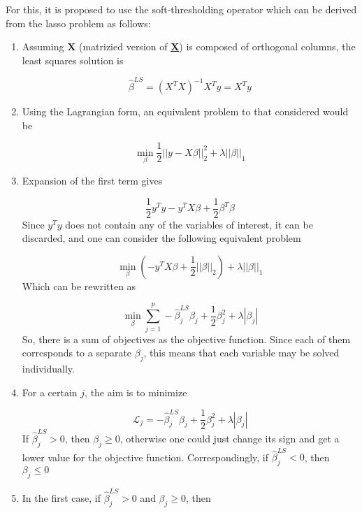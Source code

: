 For this, it is proposed to use the soft-thresholding operator which can be derived from the lasso problem as follows:
\vspace{15pt}
\begin{enumerate}
    \item Assuming \textbf{X} (matrizied version of \textbf{\underline{X}}) is composed of orthogonal columns, the least squares solution is
    
    \begin{equation}
        \hat{\beta}^{LS}=(X^TX)^{-1}X^Ty=X^Ty
    \end{equation}
    \item Using the Lagrangian form, an equivalent problem to that considered would be
    
    \begin{equation}
        \min_\beta\frac{1}{2}||y-X\beta||^2_2+\lambda||\beta||_1
    \end{equation}
    \item Expansion of the first term gives
    
    \begin{equation}
        \frac{1}{2}y^Ty-y^TX\beta+\frac{1}{2}\beta^T\beta
    \end{equation}
    Since $y^Ty$ does not contain any of the variables of interest, it can be discarded, and one can consider the following equivalent problem
    
    \begin{equation}
        \min_\beta(-y^TX\beta+\frac{1}{2}||\beta||_2)+\lambda||\beta||_1
    \end{equation}
    Which can be rewritten as
    
    \begin{equation}
        \min_\beta \sum_{j=1}^{p}-\hat{\beta}^{LS}_j\beta_j+\frac{1}{2}\beta^2_j+\lambda|\beta_j|
    \end{equation}
    So, there is a sum of objectives as the objective function. Since each of them corresponds to a separate $\beta_j$, this means that each variable may be solved individually.
    \item For a certain $j$, the aim is to minimize
    
    \begin{equation}
        \mathcal{L}_j = -\hat{\beta}^{LS}_j\beta_j+\frac{1}{2}\beta^2_j+\lambda|\beta_j|
    \end{equation}
    If $\hat{\beta}^{LS}_j > 0$, then $\beta_j \geq 0$, otherwise one could just change its sign and get a lower value for the objective function. Correspondingly, if $\hat{\beta}^{LS}_j < 0$, then $\beta_j \leq 0$
    \item In the first case, if $\hat{\beta}^{LS}_j > 0$ and $\beta_j \geq 0$, then
    

\end{enumerate}

